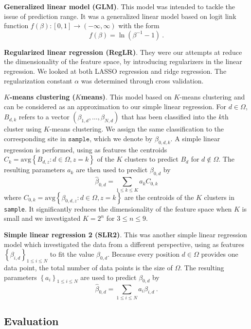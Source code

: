 \documentclass{article} %
\begin{document}
\textbf{Generalized linear model (GLM)}. This model was intended to tackle the issue of prediction range. It was a generalized linear model based on logit link function $f(\beta): [0,1] \to (-\infty,\infty)$ with the form
\[ f(\beta) = \ln(\beta^{-1} - 1) \ .\]

\textbf{Regularized linear regression (RegLR)}. They were our attempts at reduce the dimensionality of the feature space, by introducing regularizers in the linear regression. We looked at both LASSO regression and ridge regression. The regularization constant $\alpha$ was determined through cross validation.

\textbf{$K$-means clustering ($K$means)}. This model based on $K$-means clustering and can be considered as an approximation to our simple linear regression. For $d \in \Omega$, $B_{d,k}$ refers to a vector $ \left(\beta_{1,d},\dots,\beta_{N,d}\right)$ that has been classified into the $k$th cluster using $K$-means clustering. We assign the same classification to the corresponding site in $\texttt{sample}$, which we denote by $\beta_{0,d,k}$. A simple linear regression is performed, using as features the centroids $C_k = \text{avg}\left\{B_{d,z} : d \in \Omega, z = k\right\}$ of the $K$ clusters to predict $B_{d}$ for $d \notin \Omega$. The resulting parameters $a_k$ are then used to predict $\beta_{0,d}$ by
\[ \hat{\beta}_{0,d} = \sum_{1 \leq k \leq K} a_k C_{0,k}\]
where $C_{0,k} = \text{avg}\left\{\beta_{0,d,z} : d \in \Omega, z = k\right\}$ are the centroids of the $K$ clusters in \texttt{sample}. It significantly reduces the dimensionality of the feature space when $K$ is small and we investigated $K = 2^n$ for $3 \leq n \leq 9$. 

\textbf{Simple linear regression 2 (SLR2)}. This was another simple linear regression model which investigated the data from a different perspective, using as features $\left\{ \beta_{i,d} \right\}_{1\leq i \leq N}$ to fit the value $\beta_{0,d}$. Because every position $d \in \Omega$ provides one data point, the total number of data points is the size of $\Omega$. The resulting parameters $\left\{ a_{i}\right\}_{1\leq i \leq N}$ are used to predict $\beta_{0,d}$ by
\begin{equation} \label{beta.samples} \hat{\beta}_{0,d} = \sum_{1 \leq i \leq N} a_i \beta_{i,d} \ .\end{equation}


\subsection{Evaluation}
\end{document}
